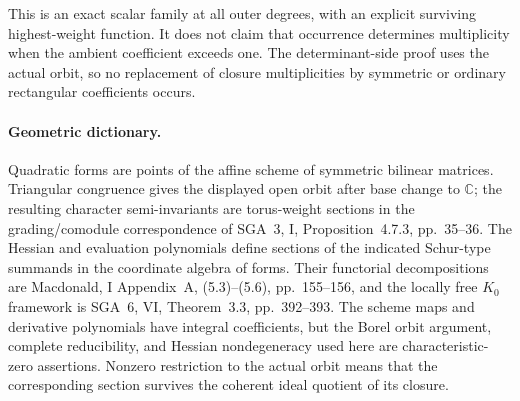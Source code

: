 This is an exact scalar family at all outer degrees, with
an explicit surviving highest-weight function. It does not
claim that occurrence determines multiplicity when the ambient
coefficient exceeds one. The determinant-side proof uses
the actual orbit, so no replacement of closure multiplicities
by symmetric or ordinary rectangular coefficients occurs.

\paragraph{Geometric dictionary.}
Quadratic forms are points of the affine scheme of symmetric
bilinear matrices. Triangular congruence gives the displayed
open orbit after base change to $\mathbb C$; the resulting
character semi-invariants are torus-weight sections in the
grading/comodule correspondence of SGA~3, I, Proposition~4.7.3,
pp.~35--36. The Hessian and evaluation polynomials define
sections of the indicated Schur-type summands in the coordinate
algebra of forms. Their functorial decompositions are Macdonald,
I Appendix~A, (5.3)--(5.6), pp.~155--156, and the locally free
$K_0$ framework is SGA~6, VI, Theorem~3.3, pp.~392--393.
The scheme maps and derivative polynomials have integral
coefficients, but the Borel orbit argument, complete
reducibility, and Hessian nondegeneracy used here are
characteristic-zero assertions. Nonzero restriction to the
actual orbit means that the corresponding section survives
the coherent ideal quotient of its closure.
